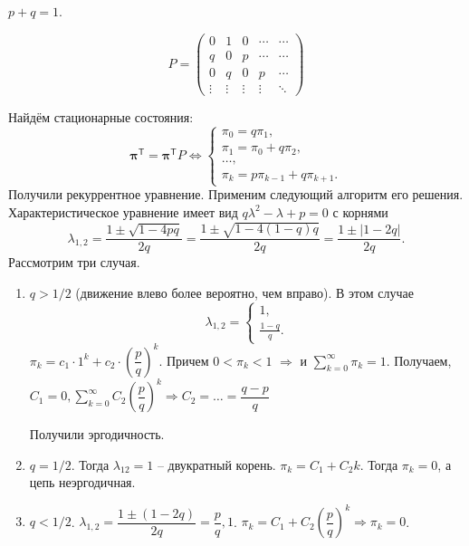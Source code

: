 \begin{ex}
  $p+q=1$.

  \[
    P = \begin{pmatrix}
      0 & 1 & 0 & \cdots & \cdots\\
      q & 0 & p & \cdots & \cdots\\
      0 & q & 0 & p & \cdots \\
      \vdots & \vdots & \vdots & \vdots & \ddots
    \end{pmatrix} 
  \]

  Найдём стационарные состояния:
  \[
    \bm\pi^{\mathsf T} = \bm\pi^{\mathsf T} P \Leftrightarrow
    \begin{cases}
      \pi_0 = q \pi_1, \\
      \pi_1 = \pi_0 + q \pi_2, \\
      \dots, \\
      \pi_k = p \pi_{k-1} + q \pi_{k+1}.
    \end{cases}
  \]
  Получили рекуррентное уравнение. Применим следующий алгоритм его решения.
  Характеристическое уравнение имеет вид $q \lambda^2 - \lambda + p = 0$ с
  корнями
  \[
    \lambda_{1, 2} = \dfrac{1\pm \sqrt{1-4pq}}{2q} = \dfrac{1 \pm \sqrt{1 - 4(1-q)q}}{2q}
    = \dfrac{1 \pm |1 - 2q|}{2q}.
  \]
  Рассмотрим три случая.
  \begin{enumerate}
    \item $q > 1/2$ (движение влево более вероятно, чем вправо). В этом случае
      \[
        \lambda_{1, 2} = \begin{cases} 1,\\ \frac{1-q}{q}.\end{cases}
      \]
      $\pi_k = c_1 \cdot 1^k + c_2 \cdot \left( \dfrac{p}{q} \right)^k$.
      Причем $0 < \pi_k < 1$ $\Rightarrow$ и $\sum_{k=0}^\infty \pi_k = 1$.
      Получаем, $C_1 = 0, \sum_{k=0}^\infty C_2 \left( \dfrac{p}{q} \right)^k 
      \Rightarrow C_2 = \dots = \dfrac{q-p}{q}$

      Получили эргодичность.

    \item $q = 1/2$. Тогда $\lambda_{12} = 1$ -- двукратный корень. $\pi_k = C_1 + C_2 k$. 
      Тогда $\pi_k = 0$, а цепь неэргодичная.

    \item $q<1/2$. $\lambda_{1, 2} = \dfrac{1 \pm (1-2q)}{2q} = \dfrac{p}{q}, 1$.
      $\pi_k = C_1 + C_2 \left(\dfrac{p}{q}\right)^{k} \Rightarrow \pi_k = 0$.
  \end{enumerate}
\end{ex}

